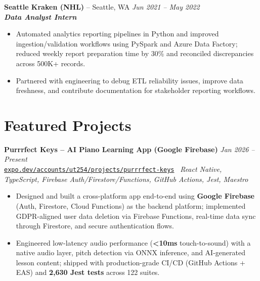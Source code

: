\documentclass[10pt,a4paper]{article}
\newcommand{\jobentry}[4]{%
  \Needspace{3\baselineskip}%
  \textbf{#1} -- #2 \hfill \textit{#3}\\[-0.15em]
  \textit{#4}\\[-0.25em]
}
\newcommand{\projectentryurl}[5]{%
  \Needspace{3\baselineskip}%
  \textbf{#1} \hfill \textit{#2}\\[-0.15em]
  {\small\href{#3}{\texttt{#4}}} \textbar\ \textit{#5}\\[-0.25em]
}
\begin{document}
\jobentry{Seattle Kraken (NHL)}{Seattle, WA}{Jun 2021 -- May 2022}{\textbf{\textit{Data Analyst Intern}}}
\begin{itemize}
  \item Automated analytics reporting pipelines in Python and improved ingestion/validation workflows using PySpark and Azure Data Factory; reduced weekly report preparation time by 30\% and reconciled discrepancies across 500K+ records.
  \item Partnered with engineering to debug ETL reliability issues, improve data freshness, and contribute documentation for stakeholder reporting workflows.
\end{itemize}

\clearpage
\section*{Featured Projects}
\projectentryurl{Purrrfect Keys -- AI Piano Learning App (Google Firebase)}{Jan 2026 -- Present}{https://expo.dev/accounts/ut254/projects/purrrfect-keys/builds/229bd252-c684-4af5-b39f-4f3623455a7e}{expo.dev/accounts/ut254/projects/purrrfect-keys}{React Native, TypeScript, Firebase Auth/Firestore/Functions, GitHub Actions, Jest, Maestro}
\begin{itemize}
  \item Designed and built a cross-platform app end-to-end using \textbf{Google Firebase} (Auth, Firestore, Cloud Functions) as the backend platform; implemented GDPR-aligned user data deletion via Firebase Functions, real-time data sync through Firestore, and secure authentication flows.
  \item Engineered low-latency audio performance (\textbf{\textless10ms} touch-to-sound) with a native audio layer, pitch detection via ONNX inference, and AI-generated lesson content; shipped with production-grade CI/CD (GitHub Actions + EAS) and \textbf{2,630 Jest tests} across 122 suites.
\end{itemize}
\end{document}

